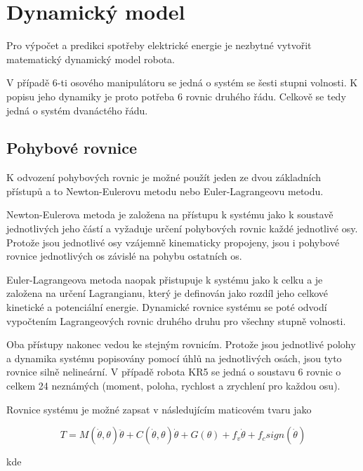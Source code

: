 

\chapter{Dynamický model}

Pro výpočet a predikci spotřeby elektrické energie je nezbytné vytvořit matematický dynamický model robota. 

V případě 6-ti osového manipulátoru se jedná o systém se šesti stupni volnosti. K popisu jeho dynamiky je proto potřeba 6 rovnic druhého řádu. Celkově se tedy jedná o systém dvanáctého řádu. 

\section{Pohybové rovnice}

K odvození pohybových rovnic je možné použít jeden ze dvou základních přístupů a to Newton-Eulerovu metodu nebo Euler-Lagrangeovu metodu. 

Newton-Eulerova metoda je založena na přístupu k systému jako k soustavě jednotlivých jeho částí a vyžaduje určení pohybových rovnic každé jednotlivé osy. Protože jsou jednotlivé osy vzájemně kinematicky propojeny, jsou i pohybové rovnice jednotlivých os závislé na pohybu ostatních os. 

Euler-Lagrangeova metoda naopak přistupuje k systému jako k celku a je založena na určení Lagrangianu, který je definován jako rozdíl jeho celkové kinetické a potenciální energie. Dynamické rovnice systému se poté odvodí vypočtením Lagrangeových rovnic druhého druhu pro všechny stupně volnosti.

Oba přístupy nakonec vedou ke stejným rovnicím. Protože jsou jednotlivé polohy a dynamika systému popisovány pomocí úhlů na jednotlivých osách, jsou tyto rovnice silně nelineární. V případě robota KR5 se jedná o soustavu 6 rovnic o celkem 24 neznámých (moment, poloha, rychlost a zrychlení pro každou osu). 

Rovnice systému je možné zapsat v následujícím maticovém tvaru jako 

\begin{equation}
T = M(\dot{\theta},\theta)\ddot{\theta} + C(\dot{\theta},\theta)\dot{\theta} + G(\theta) + f_v\dot{\theta} + f_csign(\dot{\theta})
\label{dyn_rovnice_eq}
\end{equation}

kde

